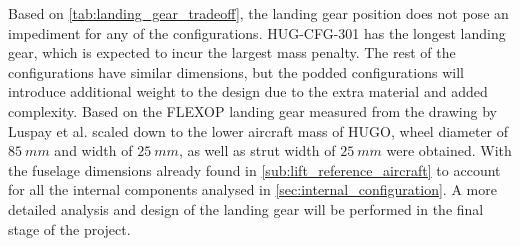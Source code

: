 Based on \autoref{tab:landing_gear_tradeoff}, the landing gear position does not pose an impediment for any of the configurations. HUG-CFG-301 has the longest landing gear, which is expected to incur the largest mass penalty. The rest of the configurations have similar dimensions, but the podded configurations will introduce additional weight to the design due to the extra material and added complexity.%
Based on the FLEXOP landing gear measured from the drawing by Luspay et al. \cite{flexop_lg} scaled down to the lower aircraft mass of HUGO, wheel diameter of $85\  mm$ and width of $25\ mm$, as well as strut width of $25\ mm$ were obtained.
With the fuselage dimensions already found in \autoref{sub:lift_reference_aircraft} to account for all the internal components analysed in \autoref{sec:internal_configuration}. A more detailed analysis and design of the landing gear will be performed in the final stage of the project.





